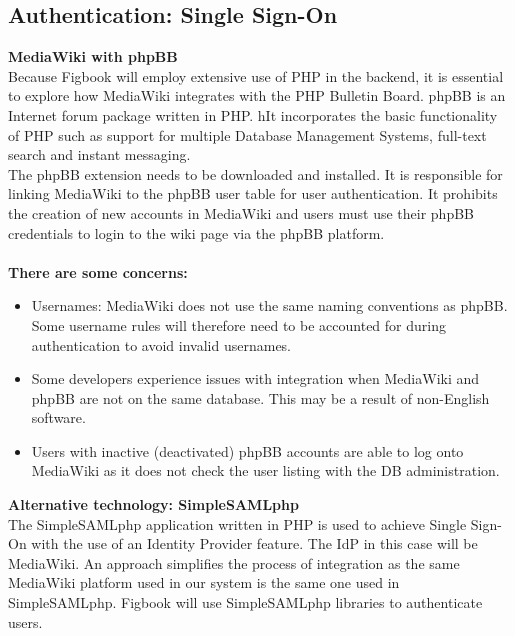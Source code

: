 \documentclass[11pt,a4paper,titlepage]{article}
\begin{document}
\subsection{Authentication: Single Sign-On}

\textbf{MediaWiki with phpBB} \\
Because Figbook will employ extensive use of PHP in the backend, it is essential to explore how MediaWiki integrates with the PHP Bulletin Board. phpBB  is an Internet forum package written in PHP. hIt incorporates the basic functionality of PHP such as support for multiple Database Management Systems, full-text search and instant messaging.\\

The phpBB extension needs to be downloaded and installed. It is responsible for linking MediaWiki to the phpBB user table for user authentication. It prohibits the creation of new accounts in MediaWiki and users must use their phpBB credentials to login to the wiki page via the phpBB platform. \\ \\

\textbf{There are some concerns:}
\begin{itemize}	
		
			  \item Usernames: MediaWiki does not use the same naming conventions as phpBB. Some username rules will therefore need to be accounted for during authentication to avoid invalid usernames.
			  \item Some developers experience issues with integration when MediaWiki and phpBB are not on the same database. This may be a result of non-English software.
			  \item Users with inactive (deactivated) phpBB accounts are able to log onto MediaWiki as it does not check the user listing with the DB administration.
\end{itemize}

\textbf{Alternative technology: SimpleSAMLphp} \\
The SimpleSAMLphp application written in PHP is used to achieve Single Sign-On with the use of an Identity Provider feature. The IdP in this case will be MediaWiki. An approach simplifies the process of integration as the same MediaWiki platform used in our system is the same one used in SimpleSAMLphp. Figbook will use SimpleSAMLphp libraries to authenticate users. \\ \\
\end{document}
